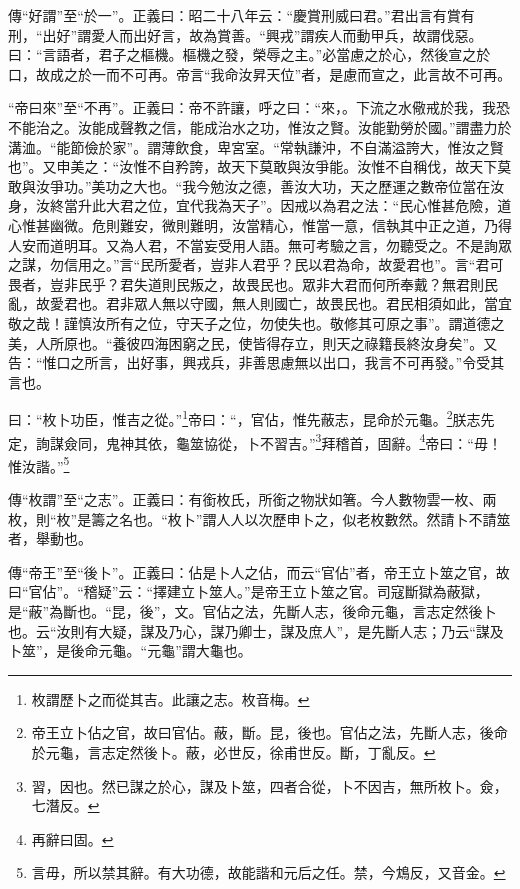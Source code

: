 {\noindent\zhuan{}\fzbyks 傳“好謂”至“於一”。正義曰：昭二十八年云：“慶賞刑威曰君。”君出言有賞有刑，“出好”謂愛人而出好言，故為賞善。“興戎”謂疾人而動甲兵，故謂伐惡。曰：“言語者，君子之樞機。樞機之發，榮辱之主。”必當慮之於心，然後宣之於口，故成之於一而不可再。帝言“我命汝昇天位”者，是慮而宣之，此言故不可再。 \par}

{\noindent\shu{}\fzkt “帝曰來”至“不再”。正義曰：帝不許讓，呼之曰：“來，。下流之水儆戒於我，我恐不能治之。汝能成聲教之信，能成治水之功，惟汝之賢。汝能勤勞於國。”謂盡力於溝洫。“能節儉於家”。謂薄飲食，卑宮室。“常執謙沖，不自滿溢誇大，惟汝之賢也”。又申美之：“汝惟不自矜誇，故天下莫敢與汝爭能。汝惟不自稱伐，故天下莫敢與汝爭功。”美功之大也。“我今勉汝之德，善汝大功，天之歷運之數帝位當在汝身，汝終當升此大君之位，宜代我為天子”。因戒以為君之法：“民心惟甚危險，道心惟甚幽微。危則難安，微則難明，汝當精心，惟當一意，信執其中正之道，乃得人安而道明耳。又為人君，不當妄受用人語。無可考驗之言，勿聽受之。不是詢眾之謀，勿信用之。”言“民所愛者，豈非人君乎？民以君為命，故愛君也”。言“君可畏者，豈非民乎？君失道則民叛之，故畏民也。眾非大君而何所奉戴？無君則民亂，故愛君也。君非眾人無以守國，無人則國亡，故畏民也。君民相須如此，當宜敬之哉！謹慎汝所有之位，守天子之位，勿使失也。敬修其可原之事”。謂道德之美，人所原也。“養彼四海困窮之民，使皆得存立，則天之祿籍長終汝身矣”。又告：“惟口之所言，出好事，興戎兵，非善思慮無以出口，我言不可再發。”令受其言也。 \par}

曰：“枚卜功臣，惟吉之從。”\footnote{枚謂歷卜之而從其吉。此讓之志。枚音梅。}帝曰：“，官佔，惟先蔽志，昆命於元龜。\footnote{帝王立卜佔之官，故曰官佔。蔽，斷。昆，後也。官佔之法，先斷人志，後命於元龜，言志定然後卜。蔽，必世反，徐甫世反。斷，丁亂反。}朕志先定，詢謀僉同，鬼神其依，龜筮協從，卜不習吉。”\footnote{習，因也。然已謀之於心，謀及卜筮，四者合從，卜不因吉，無所枚卜。僉，七潛反。}拜稽首，固辭。\footnote{再辭曰固。}帝曰：“毋！惟汝諧。”\footnote{言毋，所以禁其辭。有大功德，故能諧和元后之任。禁，今鴆反，又音金。}

{\noindent\zhuan{}\fzbyks 傳“枚謂”至“之志”。正義曰：有銜枚氏，所銜之物狀如箸。今人數物雲一枚、兩枚，則“枚”是籌之名也。“枚卜”謂人人以次歷申卜之，似老枚數然。然請卜不請筮者，舉動也。 \par}

{\noindent\zhuan{}\fzbyks 傳“帝王”至“後卜”。正義曰：佔是卜人之佔，而云“官佔”者，帝王立卜筮之官，故曰“官佔”。“稽疑”云：“擇建立卜筮人。”是帝王立卜筮之官。司寇斷獄為蔽獄，是“蔽”為斷也。“昆，後”，文。官佔之法，先斷人志，後命元龜，言志定然後卜也。云“汝則有大疑，謀及乃心，謀乃卿士，謀及庶人”，是先斷人志；乃云“謀及卜筮”，是後命元龜。“元龜”謂大龜也。 \par}

